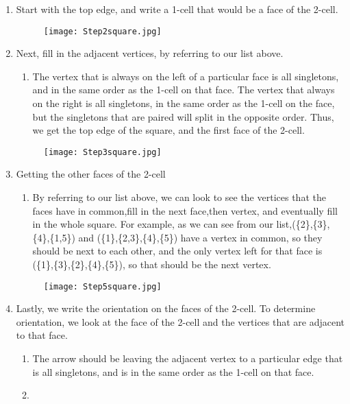 \documentclass{amsart}
\begin{document}
\begin{exmp}
\begin{enumerate}
\begin{figure}[h]
\end{figure}
\item
Start with the top edge, and write a 1-cell that would be a face of the 2-cell.  
\begin{figure}[h] 
\texttt{[image: Step2square.jpg]}
\centering
\end{figure}
\item
Next, fill in the adjacent vertices, by referring to our list above.
\begin{enumerate}
\item 
The vertex that is always on the left of a particular face is all singletons, and in the same order as the 1-cell on that face. The vertex that always on the right is all singletons, in the same order as the 1-cell on the face, but the singletons that are paired will split in the opposite order. Thus, we get the top edge of the square, and the first face of the 2-cell.\\
\end{enumerate}
\begin{figure}[h] 
\texttt{[image: Step3square.jpg]}
\centering
\end{figure}
\item
Getting the other faces of the 2-cell
\begin{enumerate}
\item
By referring to our list above, we can look to see the vertices that the faces have in common,fill in the next face,then vertex, and eventually fill in the whole square.
For example, as we can see from our list,(\{2\},\{3\},\{4\},\{1,5\}) and (\{1\},\{2,3\},\{4\},\{5\}) have a vertex in common, so they should be next to each other, and the only vertex left for that face is (\{1\},\{3\},\{2\},\{4\},\{5\}), so that should be the next vertex.
\end{enumerate}
\begin{figure}[h] 
\texttt{[image: Step5square.jpg]}
\centering
\end{figure}
\item
Lastly, we write the orientation on the faces of the 2-cell. To determine orientation, we look at the face of the 2-cell and the vertices that are adjacent to that face.
\begin{enumerate}
\item
The arrow should be leaving the adjacent vertex to a particular edge that is all singletons, and is in the same order as the 1-cell on that face.
\item

\end{enumerate}
\end{enumerate}
\end{exmp}
\end{document}
